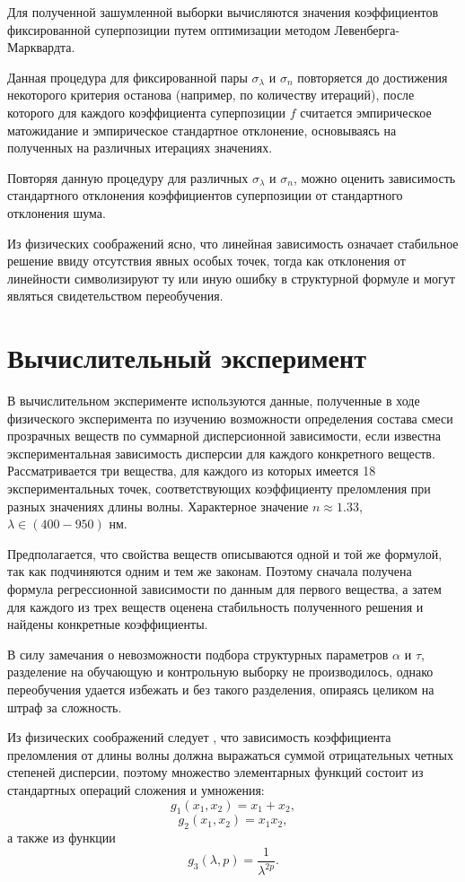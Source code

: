 \documentclass[12pt,a4paper]{article}
\begin{document}
Для полученной зашумленной выборки вычисляются значения коэффициентов фиксированной
суперпозиции путем оптимизации методом Левенберга-Марквардта.

Данная процедура для фиксированной пары $\sigma_{\lambda}$ и $\sigma_n$ повторяется
до достижения некоторого критерия останова (например, по количеству итераций),
после которого для каждого коэффициента суперпозиции $f$ считается эмпирическое
матожидание и эмпирическое стандартное отклонение, основываясь на полученных на
различных итерациях значениях.

Повторяя данную процедуру для различных $\sigma_{\lambda}$ и $\sigma_n$, можно
оценить зависимость стандартного отклонения коэффициентов суперпозиции от
стандартного отклонения шума.

Из физических соображений ясно, что линейная зависимость означает стабильное решение
ввиду отсутствия явных особых точек, тогда как отклонения от линейности символизируют
ту или иную ошибку в структурной формуле и могут являться свидетельством переобучения.

\section{Вычислительный эксперимент}

В вычислительном эксперименте используются данные, полученные в ходе физического
эксперимента по изучению возможности определения состава смеси прозрачных
веществ по суммарной дисперсионной зависимости, если известна экспериментальная
зависимость дисперсии для каждого конкретного веществ. Рассматривается три
вещества, для каждого из которых имеется 18 экспериментальных точек,
соответствующих коэффициенту преломления при разных значениях длины волны.
Характерное значение $n \approx 1.33$, $\lambda \in (400-950)$ нм.

Предполагается, что свойства веществ описываются одной и той же формулой, так
как подчиняются одним и тем же законам. Поэтому сначала получена формула
регрессионной зависимости по данным для первого вещества, а затем для каждого
из трех веществ оценена стабильность полученного решения и найдены конкретные
коэффициенты.

В силу замечания о невозможности подбора структурных параметров $\alpha$ и $\tau$,
разделение на обучающую и контрольную выборку не производилось, однако переобучения
удается избежать и без такого разделения, опираясь целиком на штраф за сложность.

Из физических соображений следует \cite{Serova11}, что зависимость коэффициента преломления
от длины волны должна выражаться суммой отрицательных четных степеней дисперсии,
поэтому множество элементарных функций состоит из стандартных операций сложения и умножения:
\[
  g_1(x_1, x_2) = x_1 + x_2,
\]
\[
  g_2(x_1, x_2) = x_1 x_2,
\]
а также из функции
\[
  g_3(\lambda, p) = \frac{1}{\lambda^{2p}}.
\]
\end{document}
